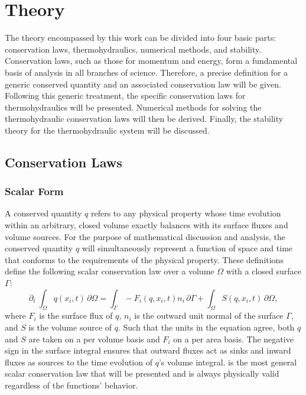 \documentclass[Prelim,12pt]{WisconsinThesis}
\newcommand{\pdt}   {\partial_t\:\!}
\newcommand{\V}     {\ensuremath{\Omega}}
\newcommand{\dV}    {\,\partial\V}
\newcommand{\IntV}  {\int_{\V}}
\renewcommand{\S}   {\ensuremath{\Gamma}}
\newcommand{\dS}    {\,\partial\S}
\newcommand{\IntS}  {\int_{\S}}
\newcommand{\q}     {\ensuremath{q}}
\begin{document}
\chapter{Theory}

The theory encompassed by this work can be divided into four basic parts: conservation laws, thermohydraulics, numerical methods, and stability.
Conservation laws, such as those for momentum and energy, form a fundamental basis of analysis in all branches of science.
Therefore, a precise definition for a generic conserved quantity and an associated conservation law will be given.
Following this generic treatment, the specific conservation laws for thermohydraulics will be presented.
Numerical methods for solving the thermohydraulic conservation laws will then be derived.
Finally, the stability theory for the thermohydraulic system will be discussed.

\section{Conservation Laws}
\subsection{Scalar Form}
A conserved quantity \q{} refers to any physical property whose time evolution within an arbitrary, closed volume exactly balances with its surface fluxes and volume sources.
For the purpose of mathematical discussion and analysis, the conserved quantity \q{} will simultaneously represent a function of space and time that conforms to the requirements of the physical property.
These definitions define the following scalar conservation law over a volume \V{} with a closed surface \S{}:%
\begin{equation}%
    \pdt\!\IntV \q(x_i,t) \dV = \IntS -F_i(\q,x_i,t) n_i\dS + \IntV S(\q,x_i,t) \dV,
    \label{Eqn:GeneralIntegralCLaw}
\end{equation}
where $F_i$ is the surface flux of \q{}, $n_i$ is the outward unit normal of the surface \S{}, and $S$ is the volume source of \q{}.
Such that the units in the equation agree, both \q{} and $S$ are taken on a per volume basis and $F_i$ on a per area basis.
The negative sign in the surface integral ensures that outward fluxes act as sinks and inward fluxes as sources to the time evolution of \q{}'s volume integral.
 is the most general scalar conservation law that will be presented and is always physically valid regardless of the functions' behavior.
\end{document}
